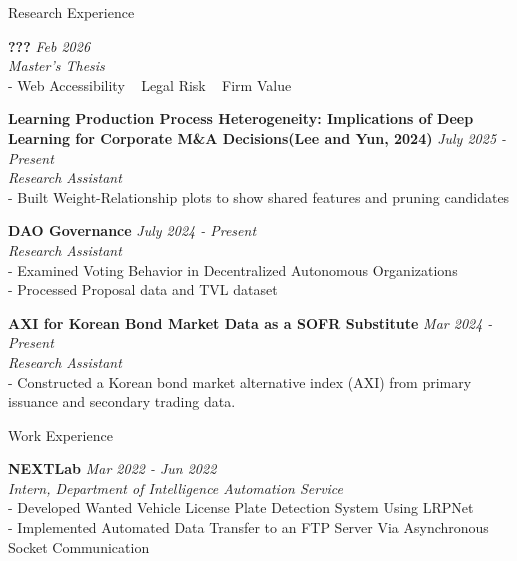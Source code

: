 \documentclass{resume} %
\begin{document}
\begin{rSection}{Research Experience}

{\bf ??? } \hfill {\em Feb 2026}
\\ { \textit {Master's Thesis}} 
\\ - Web Accessibility ~ Legal Risk ~ Firm Value

{\bf Learning Production Process Heterogeneity: Implications of Deep Learning for Corporate M\&A Decisions(Lee and Yun, 2024)} \hfill {\em July 2025 - Present}
\\ { \textit {Research Assistant}} 
\\ - Built Weight-Relationship plots to show shared features and pruning candidates 

{\bf DAO Governance} \hfill {\em July 2024 - Present}
\\ { \textit {Research Assistant}} 
\\ - Examined Voting Behavior in Decentralized Autonomous Organizations
\\ - Processed Proposal data and TVL dataset

{\bf AXI for Korean Bond Market Data as a SOFR Substitute} \hfill {\em Mar 2024 - Present}
\\ { \textit {Research Assistant}} 
\\ - Constructed a Korean bond market alternative index (AXI) from primary issuance and secondary trading data.

\end{rSection}


\begin{rSection}{Work Experience}

{\bf NEXTLab } \hfill {\em Mar 2022 - Jun 2022}
\\ \textit {Intern, Department of Intelligence Automation Service}
\\ - Developed Wanted Vehicle License Plate Detection System Using LRPNet
\\ - Implemented Automated Data Transfer to an FTP Server Via Asynchronous Socket Communication 
\end{rSection}
    

\end{document}
